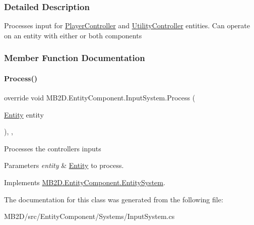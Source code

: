 \subsubsection{Detailed Description}
Processes input for \hyperlink{class_m_b2_d_1_1_entity_component_1_1_player_controller}{Player\+Controller} and \hyperlink{class_m_b2_d_1_1_entity_component_1_1_utility_controller}{Utility\+Controller} entities. Can operate on an entity with either or both components 



\subsubsection{Member Function Documentation}
\hypertarget{class_m_b2_d_1_1_entity_component_1_1_input_system_afa241f5c32788fc65587e0443f7217b3}{}\label{class_m_b2_d_1_1_entity_component_1_1_input_system_afa241f5c32788fc65587e0443f7217b3} 
\paragraph{\texorpdfstring{Process()}{Process()}}
{\footnotesize\ttfamily override void M\+B2\+D.\+Entity\+Component.\+Input\+System.\+Process (\begin{DoxyParamCaption}\item[{\hyperlink{class_m_b2_d_1_1_entity_component_1_1_entity}{Entity}}]{entity }\end{DoxyParamCaption})\hspace{0.3cm}{\ttfamily [inline]}, {\ttfamily [protected]}, {\ttfamily [virtual]}}



Processes the controllers inputs 


\begin{DoxyParams}{Parameters}
{\em entity} & \hyperlink{class_m_b2_d_1_1_entity_component_1_1_entity}{Entity} to process.\\
\hline
\end{DoxyParams}


Implements \hyperlink{class_m_b2_d_1_1_entity_component_1_1_entity_system_abbf83b87cb5d12754fb058cef50451fa}{M\+B2\+D.\+Entity\+Component.\+Entity\+System}.



The documentation for this class was generated from the following file\+:\begin{DoxyCompactItemize}
\item 
M\+B2\+D/src/\+Entity\+Component/\+Systems/Input\+System.\+cs\end{DoxyCompactItemize}
